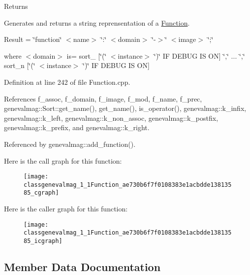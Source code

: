 \begin{DoxyReturn}{Returns}

\end{DoxyReturn}
Generates and returns a string reprensentation of a \hyperlink{classgenevalmag_1_1Function}{Function}.

Result = \char`\"{}function\char`\"{} $<$name$>$ \char`\"{}:\char`\"{} $<$domain$>$ \char`\"{}-\/$>$\char`\"{} $<$image$>$ \char`\"{};\char`\"{}

where $<$domain$>$ is= sort\_ \mbox{[}\char`\"{}(\char`\"{} $<$instance$>$ \char`\"{})\char`\"{} IF DEBUG IS ON\mbox{]} \char`\"{},\char`\"{} ... \char`\"{},\char`\"{} sort\_\-n \mbox{[}\char`\"{}(\char`\"{} $<$instance$>$ \char`\"{})\char`\"{} IF DEBUG IS ON\mbox{]} 

Definition at line 242 of file Function.cpp.



References f\_\-assoc, f\_\-domain, f\_\-image, f\_\-mod, f\_\-name, f\_\-prec, genevalmag::Sort::get\_\-name(), get\_\-name(), is\_\-operator(), genevalmag::k\_\-infix, genevalmag::k\_\-left, genevalmag::k\_\-non\_\-assoc, genevalmag::k\_\-postfix, genevalmag::k\_\-prefix, and genevalmag::k\_\-right.



Referenced by genevalmag::add\_\-function().



Here is the call graph for this function:\nopagebreak
\begin{figure}[H]
\begin{center}
\leavevmode
\texttt{[image: classgenevalmag\_1\_1Function\_ae730b6f7f0108383e1acbdde13813585\_cgraph]}
\end{center}
\end{figure}




Here is the caller graph for this function:\nopagebreak
\begin{figure}[H]
\begin{center}
\leavevmode
\texttt{[image: classgenevalmag\_1\_1Function\_ae730b6f7f0108383e1acbdde13813585\_icgraph]}
\end{center}
\end{figure}




\subsection{Member Data Documentation}
\hypertarget{classgenevalmag_1_1Function_a20f4e51ba6a747b7422406b6af6b40a1}{
\subsubsection[{f\_\-assoc}]{}}
\label{classgenevalmag_1_1Function_a20f4e51ba6a747b7422406b6af6b40a1}


